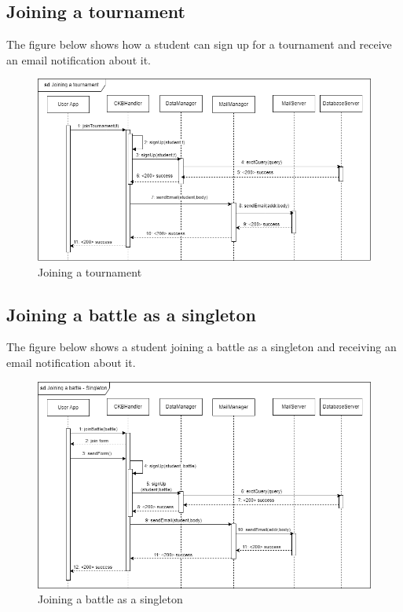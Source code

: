 \subsection{Joining a tournament}
The figure below shows how a student can sign up for a tournament and receive an email notification about it.\\
\begin{figure}[H]
    \centering
    \includegraphics[width=1\textwidth]{images/seq_diagrams/joining_tournament_DD.png}
    \caption{Joining a tournament}
\end{figure}

\subsection{Joining a battle as a singleton}
The figure below shows a student joining a battle as a singleton and receiving an email notification about it.\\
\begin{figure}[H]
    \centering
    \includegraphics[width=1\textwidth]{images/seq_diagrams/joining_battle_singleton_DD.png}
    \caption{Joining a battle as a singleton}
\end{figure}

